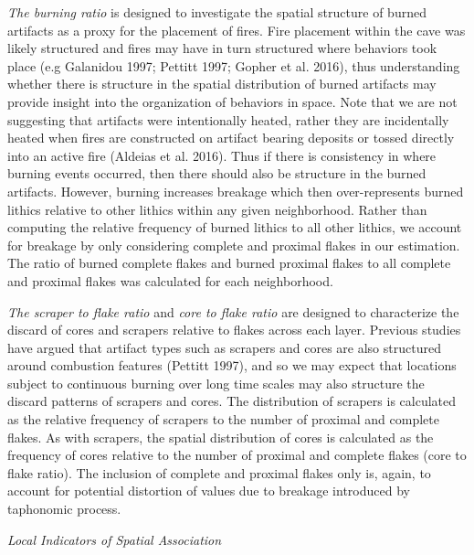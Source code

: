 \documentclass[smallextended]{svjour3}       %
\begin{document}
\emph{The burning ratio} is designed to investigate the spatial
structure of burned artifacts as a proxy for the placement of fires.
Fire placement within the cave was likely structured and fires may have
in turn structured where behaviors took place (e.g Galanidou 1997;
Pettitt 1997; Gopher et al. 2016), thus understanding whether there is
structure in the spatial distribution of burned artifacts may provide
insight into the organization of behaviors in space. Note that we are
not suggesting that artifacts were intentionally heated, rather they are
incidentally heated when fires are constructed on artifact bearing
deposits or tossed directly into an active fire (Aldeias et al. 2016).
Thus if there is consistency in where burning events occurred, then
there should also be structure in the burned artifacts. However, burning
increases breakage which then over-represents burned lithics relative to
other lithics within any given neighborhood. Rather than computing the
relative frequency of burned lithics to all other lithics, we account
for breakage by only considering complete and proximal flakes in our
estimation. The ratio of burned complete flakes and burned proximal
flakes to all complete and proximal flakes was calculated for each
neighborhood.

\emph{The scraper to flake ratio} and \emph{core to flake ratio} are
designed to characterize the discard of cores and scrapers relative to
flakes across each layer. Previous studies have argued that artifact
types such as scrapers and cores are also structured around combustion
features (Pettitt 1997), and so we may expect that locations subject to
continuous burning over long time scales may also structure the discard
patterns of scrapers and cores. The distribution of scrapers is
calculated as the relative frequency of scrapers to the number of
proximal and complete flakes. As with scrapers, the spatial distribution
of cores is calculated as the frequency of cores relative to the number
of proximal and complete flakes (core to flake ratio). The inclusion of
complete and proximal flakes only is, again, to account for potential
distortion of values due to breakage introduced by taphonomic process.

\emph{Local Indicators of Spatial Association}
\end{document}
